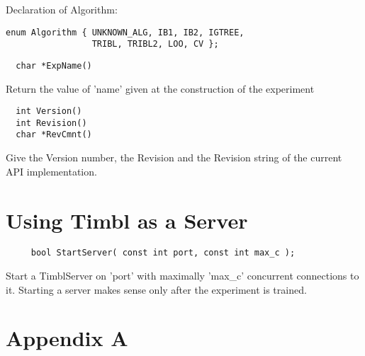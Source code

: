 \documentclass{article}
\begin{document}
Declaration of Algorithm:
\begin{verbatim}
enum Algorithm { UNKNOWN_ALG, IB1, IB2, IGTREE, 
                 TRIBL, TRIBL2, LOO, CV };
\end{verbatim}

\begin{verbatim}
  char *ExpName()
\end{verbatim}

Return the value of 'name' given at the construction of the experiment


\begin{verbatim}
  int Version()
  int Revision()
  char *RevCmnt()
\end{verbatim}

Give the Version number, the Revision and the Revision string of the
current API implementation.

\section{Using Timbl as a Server}

\begin{verbatim}
     bool StartServer( const int port, const int max_c );
\end{verbatim}

Start a TimblServer on 'port' with maximally 'max\_c' concurrent
connections to it. Starting a server makes sense only after the
experiment is trained.

\section{Appendix A}
\end{document}
